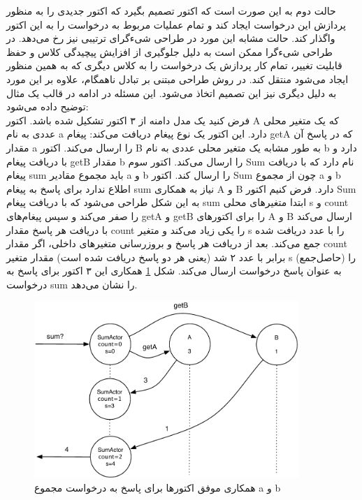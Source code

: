 حالت دوم  به این صورت است که اکتور تصمیم بگیرد که اکتور جدیدی را به منظور پردازش این درخواست ایجاد کند و تمام عملیات مربوط به درخواست را به این اکتور واگذار کند. حالت مشابه‌ این مورد در طراحی شیءگرای ترتیبی نیز رخ می‌دهد. در طراحی شیءگرا ممکن است به دلیل جلوگیری از افزایش پیچیدگی کلاس و  حفظ قابلیت تغییر، تمام کار پردازش یک درخواست را به کلاس دیگری که به همین منظور ایجاد می‌شود منتقل کند. در روش طراحی مبتنی بر تبادل ناهمگام، علاوه بر این مورد به دلیل دیگری نیز این تصمیم اتخاذ می‌شود. این مسئله در ادامه در قالب یک مثال توضیح داده می‌شود:\\
فرض کنید یک مدل دامنه از ۳ اکتور تشکیل شده باشد. اکتور A که یک متغیر محلی عددی به نام a دارد. این اکتور یک نوع پیغام دریافت می‌کند: پیغام getA که در پاسخ آن مقدار a را ارسال می‌کند. اکتور B به طور مشابه یک متغیر محلی عددی به نام b دارد و با دریافت پیغام getB مقدار b را ارسال می‌کند. اکتور سوم Sum نام دارد که با دریافت پیغام sum باید مجموع مقادیر a و b را ارسال کند. اکتور Sum چون از مجموع a و b اطلاع ندارد برای پاسخ به پیغام sum نیاز به همکاری A و B دارد. فرض کنیم اکتور Sum به این شکل طراحی می‌شود که با دریافت پیغام sum ابتدا متغیرهای محلی s و count را صفر می‌کند و سپس پیغام‌های getA و getB را برای اکتورهای A و B ارسال می‌کند با دریافت هر پاسخ مقدار count را یکی زیاد می‌کند و متغیر s را با عدد دریافت شده جمع می‌کند. بعد از دریافت هر پاسخ و بروزرسانی متغیرهای داخلی، اگر مقدار count برابر با عدد ۲ شد (یعنی هر دو پاسخ دریافت شده است) مقدار متغیر s (حاصل‌جمع) را به عنوان پاسخ درخواست ارسال می‌کند. شکل \ref{fig:coord1} همکاری این ۳ اکتور برای پاسخ به درخواست sum را نشان می‌دهد.
\begin{figure}[h]
    \begin{center}
	\includegraphics[width=10cm]{4-ProposedFramework/Figures/ExampleCoord1.pdf}
    \end{center}
    \caption{\label{fig:coord1} همکاری موفق اکتورها برای پاسخ به درخواست مجموع a و b}
\end{figure}
